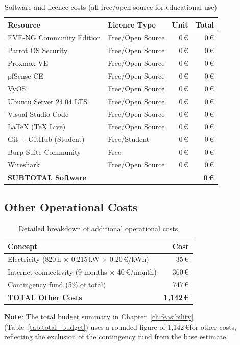 \begin{table}[H]
    \centering
    \begin{tabularx}{\textwidth}{Xlrr}
    \toprule
    \textbf{Resource} & \textbf{Licence Type} & \textbf{Unit} & \textbf{Total} \\
    \midrule
    EVE-NG Community Edition  & Free/Open Source  & 0\,\euro & 0\,\euro \\
    Parrot OS Security        & Free/Open Source  & 0\,\euro & 0\,\euro \\
    Proxmox VE                & Free/Open Source  & 0\,\euro & 0\,\euro \\
    pfSense CE                & Free/Open Source  & 0\,\euro & 0\,\euro \\
    VyOS                      & Free/Open Source  & 0\,\euro & 0\,\euro \\
    Ubuntu Server 24.04 LTS   & Free/Open Source  & 0\,\euro & 0\,\euro \\
    Visual Studio Code        & Free/Open Source  & 0\,\euro & 0\,\euro \\
    LaTeX (TeX Live)          & Free/Open Source  & 0\,\euro & 0\,\euro \\
    Git + GitHub (Student)    & Free/Student      & 0\,\euro & 0\,\euro \\
    Burp Suite Community      & Free              & 0\,\euro & 0\,\euro \\
    Wireshark                 & Free/Open Source  & 0\,\euro & 0\,\euro \\
    \midrule
    \textbf{SUBTOTAL Software} & & & \textbf{0\,\euro} \\
    \bottomrule
    \end{tabularx}
    \caption{Software and licence costs (all free/open-source for educational use)}
    \label{tab:software_costs}
\end{table}

\subsection{Other Operational Costs}

\begin{table}[H]
    \centering
    \begin{tabularx}{\textwidth}{Xr}
    \toprule
    \textbf{Concept} & \textbf{Cost} \\
    \midrule
    Electricity (820\,h $\times$ 0.215\,kW $\times$ 0.20\,\euro/kWh) & 35\,\euro \\
    Internet connectivity (9 months $\times$ 40\,\euro/month)          & 360\,\euro \\
    Contingency fund (5\% of total)                                    & 747\,\euro \\
    \midrule
    \textbf{TOTAL Other Costs} & \textbf{1{,}142\,\euro} \\
    \bottomrule
    \end{tabularx}
    \caption{Detailed breakdown of additional operational costs}
    \label{tab:other_costs}
\end{table}

\textbf{Note}: The total budget summary in Chapter~\ref{ch:feasibility}
(Table~\ref{tab:total_budget}) uses a rounded figure of 1{,}142\,\euro for other
costs, reflecting the exclusion of the contingency fund from the base estimate.

